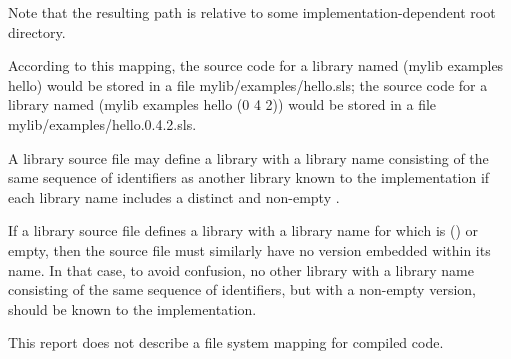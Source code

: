 Note that the resulting path is relative to some implementation-dependent root 
directory.

According to this mapping, the source code for a library named {\cf (mylib examples
  hello)} would be stored in a file {\cf mylib/examples/hello.sls};
the source code for a library named {\cf (mylib examples hello (0 4
  2))} would be stored in a file {\cf mylib/examples/hello.0.4.2.sls}.

A library source file may define a library with a library name consisting
of the same sequence of identifiers as another library known to the 
implementation if each library name includes a distinct and non-empty 
.

If a library source file defines a library with a library name for which 
 is {\cf()} or empty, then the source file must similarly 
have no version embedded within its name.  In that case, to avoid 
confusion, no other library with a library name consisting of the same
sequence of identifiers, but with a non-empty version, should be known 
to the implementation.

This report does not describe a file system mapping for compiled code.


